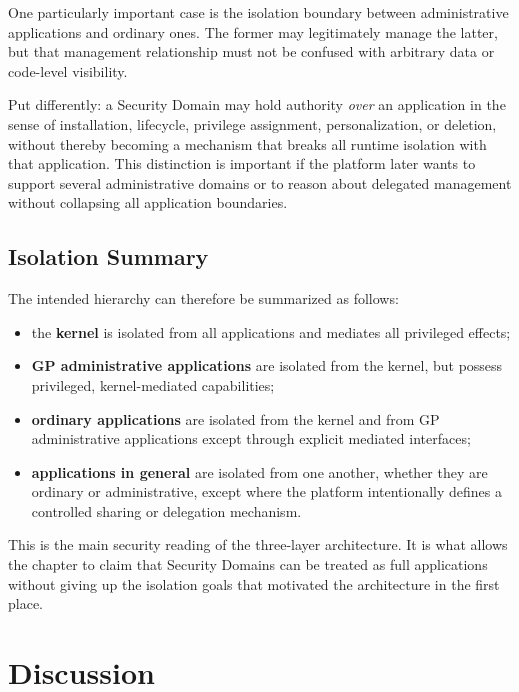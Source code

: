 One particularly important case is the isolation boundary between
administrative applications and ordinary ones. The former may legitimately
manage the latter, but that management relationship must not be confused
with arbitrary data or code-level visibility.

Put differently: a Security Domain may hold authority \emph{over} an
application in the sense of installation, lifecycle, privilege
assignment, personalization, or deletion, without thereby becoming a
mechanism that breaks all runtime isolation with that application. This
distinction is important if the platform later wants to support several
administrative domains or to reason about delegated management without
collapsing all application boundaries.

\subsection{Isolation Summary}

The intended hierarchy can therefore be summarized as follows:
\begin{itemize}
\item the \textbf{kernel} is isolated from all applications and mediates
  all privileged effects;
\item \textbf{GP administrative applications} are isolated from the
  kernel, but possess privileged, kernel-mediated capabilities;
\item \textbf{ordinary applications} are isolated from the
  kernel and from GP administrative applications except through explicit
  mediated interfaces;
\item \textbf{applications in general} are isolated from one another,
  whether they are ordinary or administrative, except where the platform
  intentionally defines a controlled sharing or delegation mechanism.
\end{itemize}

This is the main security reading of the three-layer architecture. It is
what allows the chapter to claim that Security Domains can be treated as
full applications without giving up the isolation goals that motivated
the architecture in the first place.

\section{Discussion}


